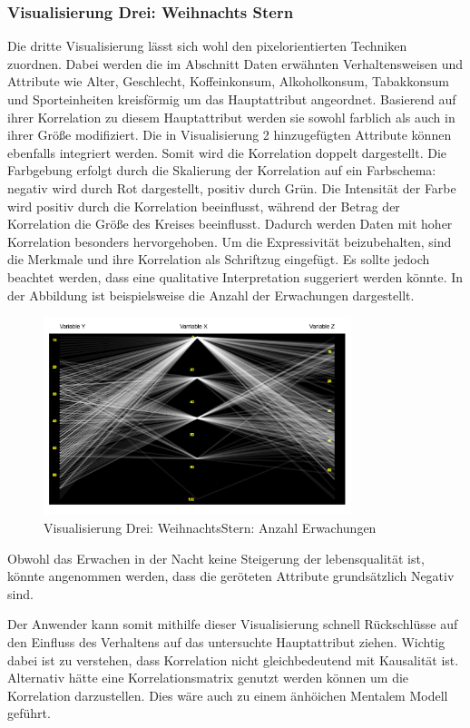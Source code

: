 \documentclass[usegeometry=true]{scrartcl}
\begin{document}
\subsubsection{Visualisierung Drei: Weihnachts Stern} 
Die dritte Visualisierung lässt sich wohl den pixelorientierten Techniken zuordnen. Dabei werden die im Abschnitt Daten erwähnten Verhaltensweisen und Attribute wie Alter, Geschlecht, Koffeinkonsum, Alkoholkonsum, Tabakkonsum und Sporteinheiten kreisförmig um das Hauptattribut angeordnet. Basierend auf ihrer Korrelation zu diesem Hauptattribut werden sie sowohl farblich als auch in ihrer Größe modifiziert. Die in Visualisierung 2 hinzugefügten Attribute können ebenfalls integriert werden. Somit wird die Korrelation doppelt dargestellt. Die Farbgebung erfolgt durch die Skalierung der Korrelation auf ein Farbschema: negativ wird durch Rot dargestellt, positiv durch Grün. Die Intensität der Farbe wird positiv durch die Korrelation beeinflusst, während der Betrag der Korrelation die Größe des Kreises beeinflusst. Dadurch werden Daten mit hoher Korrelation besonders hervorgehoben. Um die Expressivität beizubehalten, sind die Merkmale und ihre Korrelation als Schriftzug eingefügt. Es sollte jedoch beachtet werden, dass eine qualitative Interpretation suggeriert werden könnte. In der Abbildung ist beispielsweise die Anzahl der Erwachungen dargestellt.

\begin{figure}[h]
  \centering
  \includegraphics [width = 0.8\textwidth]{RoengtenBSP.JPG}
  \caption{Visualisierung Drei: WeihnachtsStern: Anzahl Erwachungen }
\end{figure}

Obwohl das Erwachen in der Nacht keine Steigerung der lebensqualität ist, könnte angenommen werden, dass die geröteten Attribute grundsätzlich Negativ sind.

Der Anwender kann somit mithilfe dieser Visualisierung schnell Rückschlüsse auf den Einfluss des Verhaltens auf das untersuchte Hauptattribut ziehen. Wichtig dabei ist zu verstehen, dass Korrelation nicht gleichbedeutend mit Kausalität ist.
Alternativ hätte eine Korrelationsmatrix genutzt werden können um die Korrelation darzustellen. Dies wäre auch zu einem änhöichen Mentalem Modell geführt.
\end{document}
